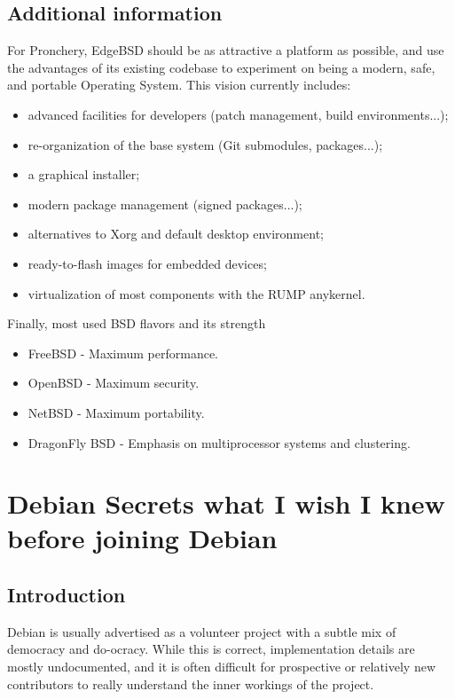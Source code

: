 \documentclass[11pt]{article}
\begin{document}
\subsection{Additional information}
For Pronchery, EdgeBSD should be as attractive a platform as possible, and use the advantages of its existing codebase to experiment on being a modern, safe, and portable Operating System. This vision currently includes:
\begin{itemize}
    \item advanced facilities for developers (patch management, build environments...);
    \item re-organization of the base system (Git submodules, packages...);
    \item a graphical installer;
    \item modern package management (signed packages...);
    \item alternatives to Xorg and default desktop environment;
    \item ready-to-flash images for embedded devices;
    \item virtualization of most components with the RUMP anykernel.
\end{itemize}

Finally, most used BSD flavors and its strength
\begin{itemize}
	\item FreeBSD - Maximum performance.
	\item OpenBSD - Maximum security.
	\item NetBSD - Maximum portability.
	\item DragonFly BSD - Emphasis on multiprocessor systems and clustering.
\end{itemize}

\newpage

\section{Debian Secrets what I wish I knew before joining Debian}

\subsection{Introduction}
Debian is usually advertised as a volunteer project with a subtle mix of democracy and do-ocracy. While this is correct, implementation details are mostly undocumented, and it is often difficult for prospective or relatively new contributors to really understand the inner workings of the project.
\end{document}
